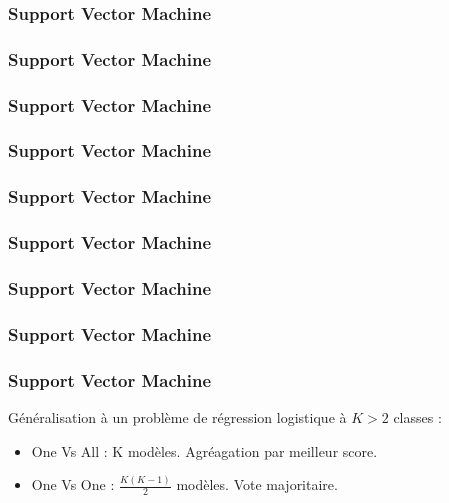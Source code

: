\begin{frame}
  \frametitle{Support Vector Machine}
\end{frame}

\begin{frame}
  \frametitle{Support Vector Machine}
\end{frame}

\begin{frame}
  \frametitle{Support Vector Machine}
\end{frame}

\begin{frame}
  \frametitle{Support Vector Machine}
\end{frame}

\begin{frame}
  \frametitle{Support Vector Machine}
\end{frame}

\begin{frame}
  \frametitle{Support Vector Machine}
\end{frame}

\begin{frame}
  \frametitle{Support Vector Machine}
\end{frame}

\begin{frame}
  \frametitle{Support Vector Machine}
\end{frame}

\begin{frame}
  \frametitle{Support Vector Machine}
  Généralisation à un problème de régression logistique à $K>2$ classes :
  \begin{itemize}
  \item One Vs All : K modèles. Agréagation par meilleur score.
  \item One Vs One : $\frac{K(K-1)}{2}$ modèles. Vote majoritaire.
  \end{itemize}
\end{frame}
